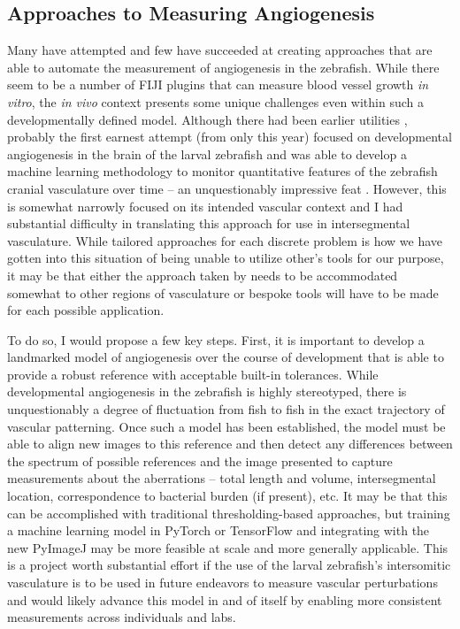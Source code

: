 \subsection{Approaches to Measuring Angiogenesis}\label{measureang}

Many have attempted and few have succeeded at creating approaches that are able to automate the measurement of angiogenesis in the zebrafish. While there seem to be a number of FIJI plugins that can measure blood vessel growth \textit{in vitro}, the \textit{in vivo} context presents some unique challenges even within such a developmentally defined model. Although there had been earlier utilities \citep{Heath2017}, probably the first earnest attempt (from only this year) focused on developmental angiogenesis in the brain of the larval zebrafish and was able to develop a machine learning methodology to monitor quantitative features of the zebrafish cranial vasculature over time -- an unquestionably impressive feat \citep{Kugler2022}. However, this is somewhat narrowly focused on its intended vascular context and I had substantial difficulty in translating this approach for use in intersegmental vasculature. While tailored approaches for each discrete problem is how we have gotten into this situation of being unable to utilize other's tools for our purpose, it may be that either the approach taken by \citeauthor{Kugler2022} needs to be accommodated somewhat to other regions of vasculature or bespoke tools will have to be made for each possible application. 

To do so, I would propose a few key steps. First, it is important to develop a landmarked model of angiogenesis over the course of development that is able to provide a robust reference with acceptable built\hyp{}in tolerances. While developmental angiogenesis in the zebrafish is highly stereotyped, there is unquestionably a degree of fluctuation from fish to fish in the exact trajectory of vascular patterning. Once such a model has been established, the model must be able to align new images to this reference and then detect any differences between the spectrum of possible references and the image presented to capture measurements about the aberrations -- total length and volume, intersegmental location, correspondence to bacterial burden (if present), etc. It may be that this can be accomplished with traditional thresholding\hyp{}based approaches, but training a machine learning model in PyTorch or TensorFlow and integrating with the new PyImageJ may be more feasible at scale and more generally applicable. This is a project worth substantial effort if the use of the larval zebrafish's intersomitic vasculature is to be used in future endeavors to measure vascular perturbations and would likely advance this model in and of itself by enabling more consistent measurements across individuals and labs. 


